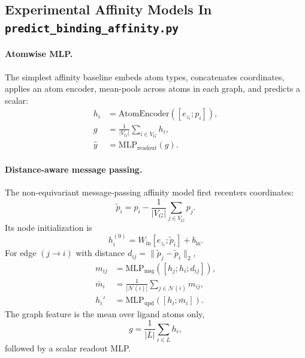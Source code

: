 \documentclass[11pt]{article}
\begin{document}
\subsection{Experimental Affinity Models In \texttt{predict\_binding\_affinity.py}}
\paragraph{Atomwise MLP.}
The simplest affinity baseline embeds atom types, concatenates coordinates, applies an atom encoder, mean-pools across atoms in each graph, and predicts a scalar:
\begin{align}
h_i &= \mathrm{AtomEncoder}([e_{z_i}; p_i]), \\
g &= \frac{1}{|V_G|} \sum_{i \in V_G} h_i, \\
\hat{y} &= \mathrm{MLP}_{\mathrm{readout}}(g).
\end{align}

\paragraph{Distance-aware message passing.}
The non-equivariant message-passing affinity model first recenters coordinates:
\begin{equation}
\tilde{p}_i = p_i - \frac{1}{|V_G|}\sum_{j \in V_G} p_j.
\end{equation}
Its node initialization is
\begin{equation}
h_i^{(0)} = W_{\mathrm{in}}[e_{z_i}; \tilde{p}_i] + b_{\mathrm{in}}.
\end{equation}
For edge $(j \to i)$ with distance $d_{ij} = \|\tilde{p}_j - \tilde{p}_i\|_2$,
\begin{align}
m_{ij} &= \mathrm{MLP}_{\mathrm{msg}}([h_j; h_i; d_{ij}]), \\
\bar{m}_i &= \frac{1}{|\mathcal{N}(i)|}\sum_{j \in \mathcal{N}(i)} m_{ij}, \\
h_i' &= \mathrm{MLP}_{\mathrm{upd}}([h_i; \bar{m}_i]).
\end{align}
The graph feature is the mean over ligand atoms only,
\begin{equation}
g = \frac{1}{|L|}\sum_{i \in L} h_i,
\end{equation}
followed by a scalar readout MLP.
\end{document}
